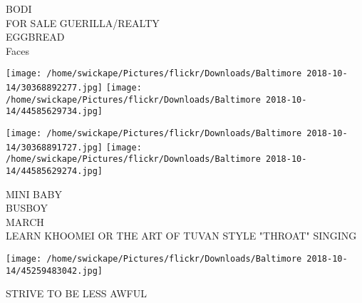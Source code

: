 \documentclass[10pt,letterpaper]{article}
\begin{document}
BODI\\
FOR SALE GUERILLA/REALTY\\
EGGBREAD\\
Faces\\
\pagebreak

\texttt{[image: /home/swickape/Pictures/flickr/Downloads/Baltimore 2018-10-14/30368892277.jpg]}
\texttt{[image: /home/swickape/Pictures/flickr/Downloads/Baltimore 2018-10-14/44585629734.jpg]}

\texttt{[image: /home/swickape/Pictures/flickr/Downloads/Baltimore 2018-10-14/30368891727.jpg]}
\texttt{[image: /home/swickape/Pictures/flickr/Downloads/Baltimore 2018-10-14/44585629274.jpg]}

MINI BABY\\
BUSBOY\\
MARCH\\
LEARN KHOOMEI OR THE ART OF TUVAN STYLE "THROAT" SINGING\\
\pagebreak

\texttt{[image: /home/swickape/Pictures/flickr/Downloads/Baltimore 2018-10-14/45259483042.jpg]}

STRIVE TO BE LESS AWFUL\\
\pagebreak
\end{document}
